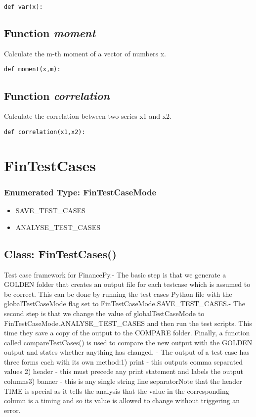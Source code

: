 \documentclass[twoside,11pt]{book}
\begin{document}
\begin{lstlisting}
def var(x):
\end{lstlisting}

\subsection{Function {\it moment}}
Calculate the m-th moment of a vector of numbers x. 

\begin{lstlisting}
def moment(x,m):
\end{lstlisting}

\subsection{Function {\it correlation}}
Calculate the correlation between two series x1 and x2. 

\begin{lstlisting}
def correlation(x1,x2):
\end{lstlisting}

\newpage
\section{FinTestCases}

\subsubsection{Enumerated Type: FinTestCaseMode}
\begin{itemize}
\item{SAVE\_TEST\_CASES}
\item{ANALYSE\_TEST\_CASES}
\end{itemize}

\subsection{Class: FinTestCases()}
Test case framework for FinancePy.- The basic step is that we generate a GOLDEN folder that creates an output file for each testcase which is assumed to be correct. This can be done by running the test cases Python file with the globalTestCaseMode flag set to FinTestCaseMode.SAVE\_TEST\_CASES.- The second step is that we change the value of globalTestCaseMode to FinTestCaseMode.ANALYSE\_TEST\_CASES and then run the test scripts. This time they save a copy of the output to the COMPARE folder. Finally, a function called compareTestCases() is used to compare the new output with the GOLDEN output and states whether anything has changed. - The output of a test case has three forms each with its own method:1) print - this outputs comma separated values 2) header - this must precede any print statement and labels the output columns3) banner - this is any single string line separatorNote that the header TIME is special as it tells the analysis that the value in the corresponding column is a timing and so its value is allowed to change without triggering an error. 
\end{document}
